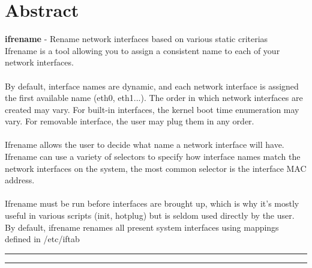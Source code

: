 \section {Abstract}

\textbf{ifrename} - Rename network interfaces based on various static criterias\\


Ifrename is a tool allowing you to assign a consistent name to each of your network interfaces.\\
\\
By default, interface names are dynamic, and each network interface is assigned the first available name (eth0, eth1...). The order in which network interfaces are created may vary. For built-in interfaces, the kernel boot time enumeration may vary. For removable interface, the user may plug them in any order.\\
\\
Ifrename allows the user to decide what name a network interface will have. Ifrename can use a variety of selectors to specify how interface names match the network interfaces on the system, the most common selector is the interface MAC address.\\
\\
Ifrename must be run before interfaces are brought up, which is why it's mostly useful in various scripts (init, hotplug) but is seldom used directly by the user. By default, ifrename renames all present system interfaces using mappings defined in /etc/iftab\\

\vspace{15pt}
\hrule
{}
\hrule
\vspace{15pt}

